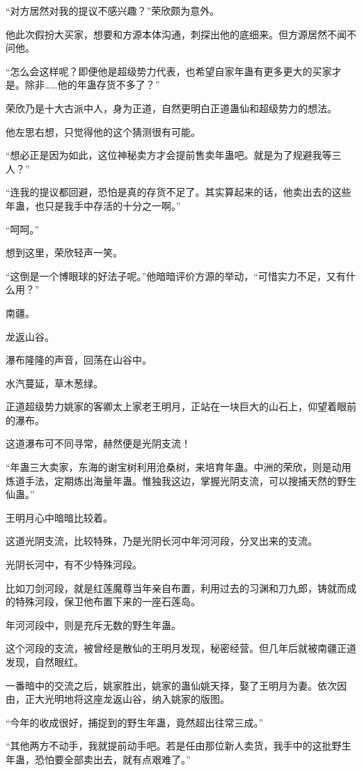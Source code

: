 \begin{this_body}
“对方居然对我的提议不感兴趣？”荣欣颇为意外。

他此次假扮大买家，想要和方源本体沟通，刺探出他的底细来。但方源居然不闻不问他。

“怎么会这样呢？即便他是超级势力代表，也希望自家年蛊有更多更大的买家才是。除非……他的年蛊存货不多了？”

荣欣乃是十大古派中人，身为正道，自然更明白正道蛊仙和超级势力的想法。

他左思右想，只觉得他的这个猜测很有可能。

“想必正是因为如此，这位神秘卖方才会提前售卖年蛊吧。就是为了规避我等三人？”

“连我的提议都回避，恐怕是真的存货不足了。其实算起来的话，他卖出去的这些年蛊，也只是我手中存活的十分之一啊。”

“呵呵。”

想到这里，荣欣轻声一笑。

“这倒是一个博眼球的好法子呢。”他暗暗评价方源的举动，“可惜实力不足，又有什么用？”

南疆。

龙返山谷。

瀑布隆隆的声音，回荡在山谷中。

水汽蔓延，草木葱绿。

正道超级势力姚家的客卿太上家老王明月，正站在一块巨大的山石上，仰望着眼前的瀑布。

这道瀑布可不同寻常，赫然便是光阴支流！

“年蛊三大卖家，东海的谢宝树利用沧桑树，来培育年蛊。中洲的荣欣，则是动用炼道手法，定期炼出海量年蛊。惟独我这边，掌握光阴支流，可以搜捕天然的野生仙蛊。”

王明月心中暗暗比较着。

这道光阴支流，比较特殊，乃是光阴长河中年河河段，分叉出来的支流。

光阴长河中，有不少特殊河段。

比如刀剑河段，就是红莲魔尊当年亲自布置，利用过去的习渊和刀九郎，铸就而成的特殊河段，保卫他布置下来的一座石莲岛。

年河河段中，则是充斥无数的野生年蛊。

这个河段的支流，被曾经是散仙的王明月发现，秘密经营。但几年后就被南疆正道发现，自然眼红。

一番暗中的交流之后，姚家胜出，姚家的蛊仙姚天择，娶了王明月为妻。依次因由，正大光明地将这座龙返山谷，纳入姚家的版图。

“今年的收成很好，捕捉到的野生年蛊，竟然超出往常三成。”

“其他两方不动手，我就提前动手吧。若是任由那位新人卖货，我手中的这批野生年蛊，恐怕要全部卖出去，就有点艰难了。”


\end{this_body}
